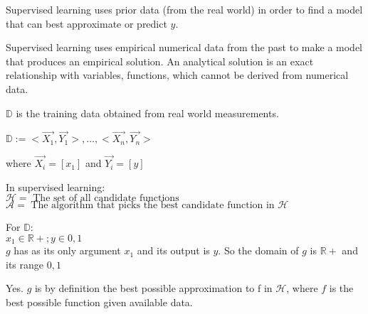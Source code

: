 \documentclass[12pt]{article}
\begin{document}
\begin{enumerate}

Supervised learning uses prior data (from the real world) in order to find a model that can best approximate or predict $y$.


Supervised learning uses empirical numerical data from the past to make a model that produces an empirical solution. An analytical solution is an exact relationship with variables, functions, which cannot be derived from numerical data. 


$\mathbb{D}$ is the training data obtained from real world measurements.

$\mathbb{D} := { <\vec{X_1}, \vec{Y_1}>, \ldots, <\vec{X_n}, \vec{Y_n} } >  $

where $\vec{X_i} = [x_1] $ and $\vec{Y_i} = [y] $

In supervised learning:\\
$\mathcal{H} = \text{ The set of all candidate functions}$\\
$\mathcal{A} = \text{ The algorithm that picks the best candidate function in } \mathcal{H} $



For $\mathbb{D}$:\\
$x_1 \in \mathbb{R+}; y \in {0,1}$\\

$g$ has as its only argument $x_1$ and its output is $y$.
So the domain of $g$ is $\mathbb{R+}$ and its range ${0,1}$


Yes. $g$ is by definition the best possible approximation to f in $\mathcal{H}$, where $f$ is the best possible function given available data.



\end{enumerate}
\end{document}
